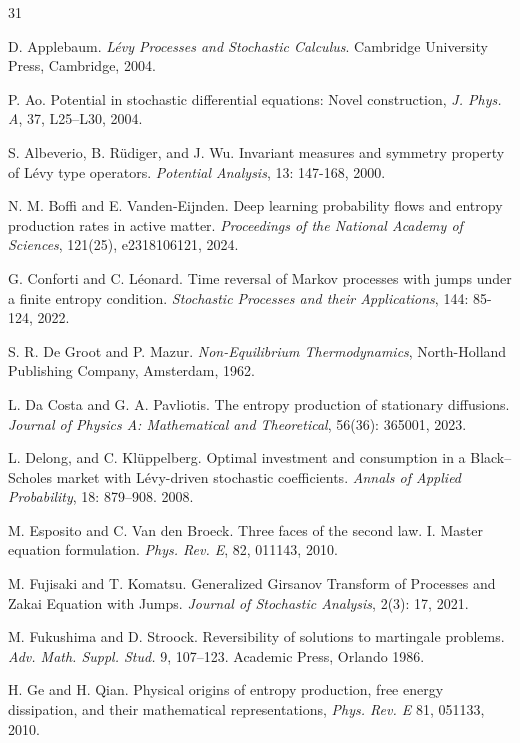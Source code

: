 \documentclass[10pt]{article}
\theoremstyle{definition}
\theoremstyle{remark}
\numberwithin{equation}{section}
\begin{document}
\begin{thebibliography}{31}


 D. Applebaum. {\it L\'{e}vy Processes and Stochastic Calculus}. Cambridge University Press, Cambridge, 2004.

 P. Ao. Potential in stochastic differential equations: Novel construction, {\it J. Phys. A}, 37, L25–L30, 2004.

 S. Albeverio, B. R\"{u}diger, and J. Wu.  Invariant measures and symmetry property of Lévy type operators. {\it Potential Analysis}, 13: 147-168, 2000.

 N. M. Boffi and E. Vanden-Eijnden. Deep learning probability flows and entropy production rates in active matter. {\it Proceedings of the National Academy of Sciences}, 121(25), e2318106121, 2024.

 G. Conforti and C. Léonard. Time reversal of Markov processes with jumps under a finite entropy condition. {\it Stochastic Processes and their Applications}, 144: 85-124, 2022.

 S. R. De Groot and P. Mazur. {\it Non-Equilibrium Thermodynamics}, North-Holland Publishing Company, Amsterdam, 1962.

 L. Da Costa and G. A. Pavliotis. The entropy production of stationary diffusions. {\it Journal of Physics A: Mathematical and Theoretical}, 56(36): 365001, 2023.

 L. Delong, and C. Kl\"{u}ppelberg. Optimal investment and consumption in a Black–Scholes market with Lévy-driven stochastic coefficients. {\it Annals of Applied Probability}, 18: 879–908. 2008.

 M. Esposito and C. Van den Broeck. Three faces of the second law. I. Master equation formulation.  {\it  Phys. Rev. E}, 82, 011143, 2010.


 M. Fujisaki and T. Komatsu.  Generalized Girsanov Transform of Processes and Zakai Equation with Jumps. { \it Journal of Stochastic Analysis}, 2(3): 17, 2021.

 M. Fukushima and D. Stroock. Reversibility of solutions to martingale problems. {\it  Adv. Math. Suppl. Stud.} 9, 107–123. Academic Press, Orlando 1986.

 H. Ge and H. Qian. Physical origins of entropy production, free energy dissipation, and their mathematical representations, {\it Phys. Rev. E} 81, 051133, 2010.


\end{thebibliography}
\end{document}
